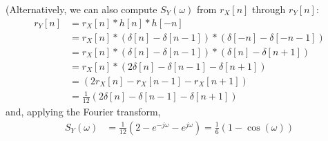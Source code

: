 \begin{solution}
\begin{parts}
(Alternatively, we can also compute $S_Y(\omega)$ from $r_X[n]$ through $r_Y[n]$:
\begin{align*}
r_Y[n] &= r_X[n]  \ast h[n] \ast h[-n]   \\
       &= r_X[n]  \ast (\delta[n]-\delta[n-1]) \ast (\delta[-n]-\delta[-n-1]) \\
       &= r_X[n]  \ast (\delta[n]-\delta[n-1]) \ast (\delta[n]-\delta[n+1])   \\
       &= r_X[n]  \ast (2\delta[n]-\delta[n-1]-\delta[n+1]) \\
       &= (2 r_X[n] -r_X[n-1]-r_X[n+1]) \\
       &= \frac{1}{12} (2  \delta[n] -  \delta[n-1] - \delta[n+1])
\end{align*}
and, applying the Fourier transform,
\begin{align*}
S_Y(\omega) 
	&= \frac{1}{12} \left(2 - e^{-j\omega} - e^{j\omega}\right)
	 = \frac{1}{6} (1 - \cos(\omega))
\end{align*}

 
\end{parts}
\end{solution}

\fi